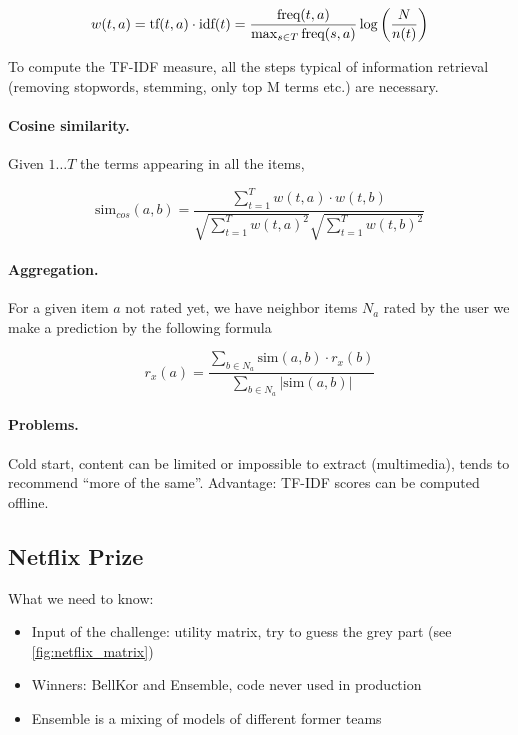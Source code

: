 \[
  w(t,a) = \text{tf}(t,a) \cdot \text{idf}(t) = \frac{\text{freq}(t,a)}{\max_{s\in T} \text{freq}(s,a)}\log\left(\frac{N}{n(t)}\right)
\]

To compute the TF-IDF measure, all the steps typical of information retrieval (removing stopwords, stemming, only top M terms etc.) are necessary.

\paragraph{Cosine similarity.} Given $1 \dots T$ the terms appearing in all the items,

\[
  \text{sim}_{cos}(a,b) = \frac {\sum_{t=1}^T w(t,a)\cdot w(t,b)}{\sqrt{\sum_{t=1}^T w(t,a)^2}\sqrt{\sum_{t=1}^T w(t,b)^2}}
\]

\paragraph{Aggregation.} For a given item $a$ not rated yet, we have neighbor items $N_a$ rated by the user we make a prediction by the following formula

\[
  r_x(a) = \frac {\sum_{b\in N_a} \text{sim}(a,b) \cdot r_x(b)}{\sum_{b\in N_a} | \text{sim}(a,b)|}
\]

\paragraph{Problems.} Cold start, content can be limited or impossible to extract (multimedia), tends to recommend “more of the same”. Advantage: TF-IDF scores can be computed offline.

\subsection{Netflix Prize}

What we need to know:

\begin{itemize}
  \item Input of the challenge: utility matrix, try to guess the grey part (see \cref{fig:netflix_matrix})
  \item Winners: BellKor and Ensemble, code never used in production
  \item Ensemble is a mixing of models of different former teams
\end{itemize}

